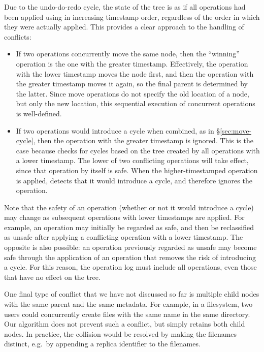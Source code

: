 \documentclass[sigplan,anonymous]{acmart}
\begin{document}
Due to the undo-do-redo cycle, the state of the tree is as if all operations had been applied using  in increasing timestamp order, regardless of the order in which they were actually applied.
This provides a clear approach to the handling of conflicts:
\begin{itemize}
    \item If two operations concurrently move the same node, then the ``winning'' operation is the one with the greater timestamp.
        Effectively, the operation with the lower timestamp moves the node first, and then the operation with the greater timestamp moves it again, so the final parent is determined by the latter.
        Since move operations do not specify the old location of a node, but only the new location, this sequential execution of concurrent operations is well-defined.
    \item If two operations would introduce a cycle when combined, as in \S\ref{sec:move-cycle}, then the operation with the greater timestamp is ignored.
        This is the case because  checks for cycles based on the tree created by all operations with a lower timestamp.
        The lower of two conflicting operations will take effect, since that operation by itself is safe.
        When the higher-timestamped operation is applied,  detects that it would introduce a cycle, and therefore ignores the operation.
\end{itemize}

Note that the safety of an operation (whether or not it would introduce a cycle) may change as subsequent operations with lower timestamps are applied.
For example, an operation may initially be regarded as safe, and then be reclassified as unsafe after applying a conflicting operation with a lower timestamp.
The opposite is also possible: an operation previously regarded as unsafe may become safe through the application of an operation that removes the risk of introducing a cycle.
For this reason, the operation log must include all operations, even those that have no effect on the tree.

One final type of conflict that we have not discussed so far is multiple child nodes with the same parent and the same metadata.
For example, in a filesystem, two users could concurrently create files with the same name in the same directory.
Our algorithm does not prevent such a conflict, but simply retains both child nodes.
In practice, the collision would be resolved by making the filenames distinct, e.g.\ by appending a replica identifier to the filenames.
\end{document}
